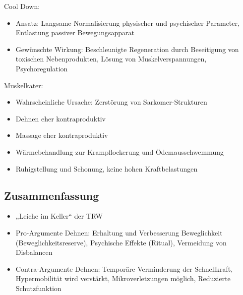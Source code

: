 Cool Down:
\begin{itemize}
    \item Ansatz: Langsame Normalisierung physischer und psychischer Parameter, Entlastung passiver Bewegungsapparat
    \item Gewünschte Wirkung: Beschleunigte Regeneration durch Beseitigung von toxischen Nebenprodukten, Lösung von Muskelverspannungen, Psychoregulation
\end{itemize}

Muskelkater:
\begin{itemize}
    \item Wahrscheinliche Ursache: Zerstörung von Sarkomer-Strukturen
    \item Dehnen eher kontraproduktiv
    \item Massage eher kontraproduktiv
    \item Wärmebehandlung zur Krampflockerung und Ödemausschwemmung
    \item Ruhigstellung und Schonung, keine hohen Kraftbelastungen
\end{itemize}

\subsection{Zusammenfassung}

\begin{itemize}
    \item „Leiche im Keller“ der TRW
    \item Pro-Argumente Dehnen: Erhaltung und Verbesserung Beweglichkeit (Beweglichkeitsreserve), Psychische Effekte (Ritual), Vermeidung von Disbalancen
    \item Contra-Argumente Dehnen: Temporäre Verminderung der Schnellkraft, Hypermobilität wird verstärkt, Mikroverletzungen möglich, Reduzierte Schutzfunktion
\end{itemize}
